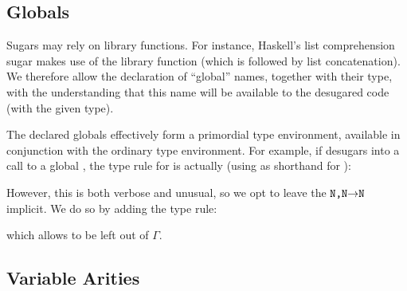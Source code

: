 \subsection{Globals}
\label{sec:rtype-globals}

Sugars may rely on library functions. For instance, Haskell's list
comprehension sugar makes use of the library function 
(which is  followed by list concatenation). We therefore
allow the declaration of ``global'' names, together with their type,
with the understanding that this name will be available to the
desugared code (with the given type).

The declared globals effectively form a primordial type environment,
available in conjunction with the ordinary type environment. For
example, if \Code{+} desugars into a call to a global , the
type rule for \Code{+} is actually (using  as shorthand for ):
\begin{prooftree}
\end{prooftree}
However, this is both verbose and unusual, so we opt to leave the
$\Code{N,N$\to$N}$ implicit. We do so by adding the type rule:
\begin{prooftree}
\end{prooftree}
which allows  to be left out of $\Gamma$.

\subsection{Variable Arities}\label{sec:rtype-arity}

